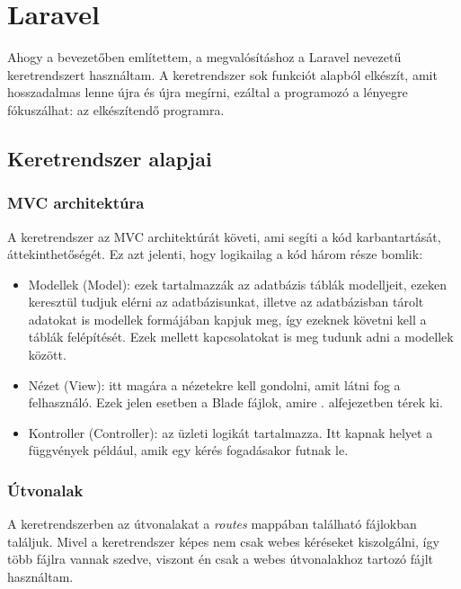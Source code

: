 \documentclass[
]{thesis-ekf}
\theoremstyle{definition}
\theoremstyle{remark}
\begin{document}
\section{Laravel}

Ahogy a bevezetőben említettem, a megvalósításhoz a Laravel nevezetű keretrendszert használtam. A keretrendszer sok funkciót alapból elkészít, amit hosszadalmas lenne újra és újra megírni, ezáltal a programozó a lényegre fókuszálhat: az elkészítendő programra.\cite{meetlaravel}

\subsection{Keretrendszer alapjai}

\subsubsection{MVC architektúra}

A keretrendszer az MVC architektúrát követi, ami segíti a kód karbantartását, áttekinthetőségét.\cite{mvc} Ez azt jelenti, hogy logikailag a kód három része bomlik:
\begin{itemize}
	\item Modellek (Model): ezek tartalmazzák az adatbázis táblák modelljeit, ezeken keresztül tudjuk elérni az adatbázisunkat, illetve az adatbázisban tárolt adatokat is modellek formájában kapjuk meg, így ezeknek követni kell a táblák felépítését. Ezek mellett kapcsolatokat is meg tudunk adni a modellek között.
	\item Nézet (View): itt magára a nézetekre kell gondolni, amit látni fog a felhasználó. Ezek jelen esetben a Blade\cite{blade} fájlok, amire . alfejezetben térek ki.
	\item Kontroller (Controller): az üzleti logikát tartalmazza. Itt kapnak helyet a függvények például, amik egy kérés fogadásakor futnak le.
\end{itemize}

\subsubsection{Útvonalak}

A keretrendszerben az útvonalakat a \emph{routes} mappában található fájlokban találjuk. Mivel a keretrendszer képes nem csak webes kéréseket kiszolgálni, így több fájlra vannak szedve, viszont én csak a webes útvonalakhoz tartozó fájlt használtam.
\end{document}
